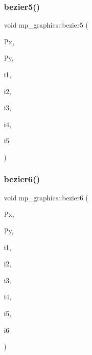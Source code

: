 \subsubsection{\texorpdfstring{bezier5()}{bezier5()}}
{\footnotesize\ttfamily void mp\+\_\+graphics\+::bezier5 (\begin{DoxyParamCaption}\item[{\mbox{\hyperlink{galois_8h_a09fddde158a3a20bd2dcadb609de11dc}{I\+NT}} $\ast$}]{Px,  }\item[{\mbox{\hyperlink{galois_8h_a09fddde158a3a20bd2dcadb609de11dc}{I\+NT}} $\ast$}]{Py,  }\item[{\mbox{\hyperlink{galois_8h_a09fddde158a3a20bd2dcadb609de11dc}{I\+NT}}}]{i1,  }\item[{\mbox{\hyperlink{galois_8h_a09fddde158a3a20bd2dcadb609de11dc}{I\+NT}}}]{i2,  }\item[{\mbox{\hyperlink{galois_8h_a09fddde158a3a20bd2dcadb609de11dc}{I\+NT}}}]{i3,  }\item[{\mbox{\hyperlink{galois_8h_a09fddde158a3a20bd2dcadb609de11dc}{I\+NT}}}]{i4,  }\item[{\mbox{\hyperlink{galois_8h_a09fddde158a3a20bd2dcadb609de11dc}{I\+NT}}}]{i5 }\end{DoxyParamCaption})}

\mbox{\label{classmp__graphics_a0a9279d8cfe335a5761fa38152fea074}} 
\subsubsection{\texorpdfstring{bezier6()}{bezier6()}}
{\footnotesize\ttfamily void mp\+\_\+graphics\+::bezier6 (\begin{DoxyParamCaption}\item[{\mbox{\hyperlink{galois_8h_a09fddde158a3a20bd2dcadb609de11dc}{I\+NT}} $\ast$}]{Px,  }\item[{\mbox{\hyperlink{galois_8h_a09fddde158a3a20bd2dcadb609de11dc}{I\+NT}} $\ast$}]{Py,  }\item[{\mbox{\hyperlink{galois_8h_a09fddde158a3a20bd2dcadb609de11dc}{I\+NT}}}]{i1,  }\item[{\mbox{\hyperlink{galois_8h_a09fddde158a3a20bd2dcadb609de11dc}{I\+NT}}}]{i2,  }\item[{\mbox{\hyperlink{galois_8h_a09fddde158a3a20bd2dcadb609de11dc}{I\+NT}}}]{i3,  }\item[{\mbox{\hyperlink{galois_8h_a09fddde158a3a20bd2dcadb609de11dc}{I\+NT}}}]{i4,  }\item[{\mbox{\hyperlink{galois_8h_a09fddde158a3a20bd2dcadb609de11dc}{I\+NT}}}]{i5,  }\item[{\mbox{\hyperlink{galois_8h_a09fddde158a3a20bd2dcadb609de11dc}{I\+NT}}}]{i6 }\end{DoxyParamCaption})}

